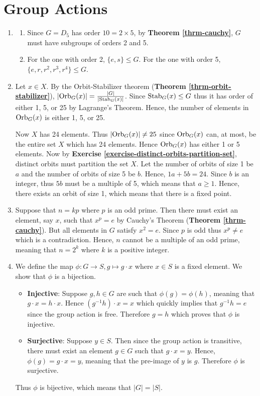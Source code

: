 \section{Group Actions}
\begin{enumerate}
    \item \begin{enumerate}[label=(\alph*)]
        \item Since $G = D_5$ has order $10 = 2 \times 5$, by \textbf{Theorem \ref{thrm-cauchy}}, $G$ must have subgroups of orders 2 and 5.
        \item For the one with order 2, $\{e, s\} \leq G$. For the one with order 5, $\{e, r, r^2, r^3, r^4\} \leq G$.
    \end{enumerate}

    \item Let $x \in X$. By the Orbit-Stabilizer theorem (\textbf{Theorem \ref{thrm-orbit-stabilizer}}), $|\mathrm{Orb}_{G}(x)| = \frac{|G|}{|\mathrm{Stab}_{G}(x)|}$. Since $\mathrm{Stab}_{G}(x) \leq G$ thus it has order of either 1, 5, or 25 by Lagrange's Theorem. Hence, the number of elements in $\mathrm{Orb}_{G}(x)$ is either 1, 5, or 25.

    Now $X$ has 24 elements. Thus $|\mathrm{Orb}_{G}(x)| \neq 25$ since $\mathrm{Orb}_{G}(x)$ can, at most, be the entire set $X$ which has 24 elements. Hence $\mathrm{Orb}_{G}(x)$ has either 1 or 5 elements. Now by \textbf{Exercise \ref{exercise-distinct-orbits-partition-set}}, distinct orbits must partition the set $X$. Let the number of orbits of size 1 be $a$ and the number of orbits of size 5 be $b$. Hence, $1a + 5b = 24$. Since $b$ is an integer, thus $5b$ must be a multiple of 5, which means that $a \geq 1$. Hence, there exists an orbit of size 1, which means that there is a fixed point.

    \item Suppose that $n = kp$ where $p$ is an odd prime. Then there must exist an element, say $x$, such that $x^p = e$ by Cauchy's Theorem (\textbf{Theorem \ref{thrm-cauchy}}). But all elements in $G$ satisfy $x^2 = e$. Since $p$ is odd thus $x^p \neq e$ which is a contradiction. Hence, $n$ cannot be a multiple of an odd prime, meaning that $n = 2^k$ where $k$ is a positive integer.

    \item We define the map $\phi: G \to S, g \mapsto g \cdot x$ where $x \in S$ is a fixed element. We show that $\phi$ is a bijection.
    \begin{itemize}
        \item \textbf{Injective}: Suppose $g, h \in G$ are such that $\phi(g) = \phi(h)$, meaning that $g\cdot x = h\cdot x$. Hence $(g^{-1}h) \cdot x = x$ which quickly implies that $g^{-1}h = e$ since the group action is free. Therefore $g = h$ which proves that $\phi$ is injective.
        \item \textbf{Surjective}: Suppose $y \in S$. Then since the group action is transitive, there must exist an element $g \in G$ such that $g \cdot x = y$. Hence, $\phi(g) = g\cdot x = y$, meaning that the pre-image of $y$ is $g$. Therefore $\phi$ is surjective.
    \end{itemize}
    Thus $\phi$ is bijective, which means that $|G| = |S|$.


\end{enumerate}

